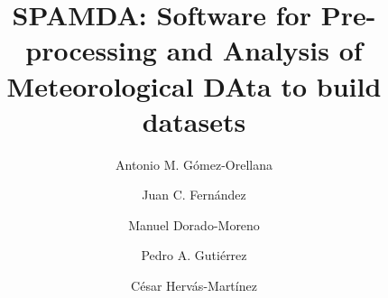 \documentclass[review]{elsarticle}
\begin{document}
	\begin{frontmatter}
	
		\title{SPAMDA: Software for Pre-processing and Analysis of Meteorological DAta to build datasets}
		
		\author[UCO]{Antonio M. G\'omez-Orellana}
		
		\author[UCO]{Juan C. Fern\'andez}
		
		\author[UCO]{Manuel Dorado-Moreno}
		
		\author[UCO]{Pedro A. Guti\'errez}
		
		\author[UCO]{C\'esar Herv\'as-Mart\'inez}
		
		\address[UCO]{Department of Computer Science and Numerical Analysis, University of Cordoba, C\'ordoba, Spain.}
		

\end{frontmatter}
\end{document}
